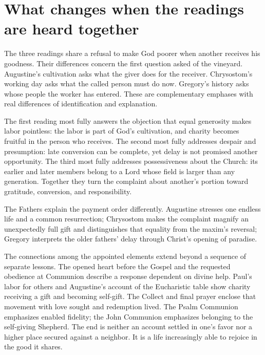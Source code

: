 \section{What changes when the readings are heard together}
The three readings share a refusal to make God poorer when another receives his goodness. Their differences concern the first question asked of the vineyard. Augustine's cultivation asks what the giver does for the receiver. Chrysostom's working day asks what the called person must do now. Gregory's history asks whose people the worker has entered. These are complementary emphases with real differences of identification and explanation.

The first reading most fully answers the objection that equal generosity makes labor pointless: the labor is part of God's cultivation, and charity becomes fruitful in the person who receives. The second most fully addresses despair and presumption: late conversion can be complete, yet delay is not promised another opportunity. The third most fully addresses possessiveness about the Church: its earlier and later members belong to a Lord whose field is larger than any generation. Together they turn the complaint about another's portion toward gratitude, conversion, and responsibility.

The Fathers explain the payment order differently. Augustine stresses one endless life and a common resurrection; Chrysostom makes the complaint magnify an unexpectedly full gift and distinguishes that equality from the maxim's reversal; Gregory interprets the older fathers' delay through Christ's opening of paradise.

The connections among the appointed elements extend beyond a sequence of separate lessons. The opened heart before the Gospel and the requested obedience at Communion describe a response dependent on divine help. Paul's labor for others and Augustine's account of the Eucharistic table show charity receiving a gift and becoming self-gift. The Collect and final prayer enclose that movement with love sought and redemption lived. The Psalm Communion emphasizes enabled fidelity; the John Communion emphasizes belonging to the self-giving Shepherd. The end is neither an account settled in one's favor nor a higher place secured against a neighbor. It is a life increasingly able to rejoice in the good it shares.
